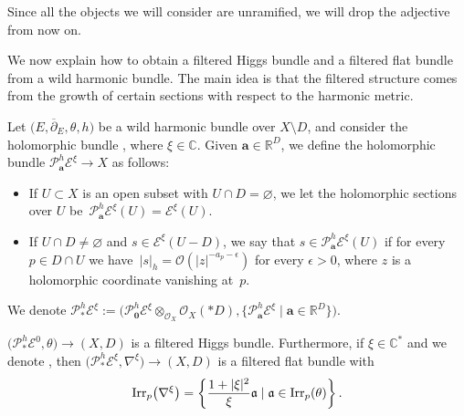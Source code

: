 \begin{Remark} Since all the objects we will consider are unramified, we will drop the adjective from now on.
\end{Remark}

We now explain how to obtain a filtered Higgs bundle and a filtered flat bundle from a wild harmonic bundle. The main idea is that the filtered structure comes from the growth of certain sections with respect to the harmonic metric.

\begin{Definition}\label{phdef} Let $\bigl(E,\overline{\partial}_E,\theta,h\bigr)$ be a wild harmonic bundle over $X\setminus D$, and consider the holomorphic bundle , where $\xi\in \mathbb{C}$. Given $\boldsymbol{a}\in \mathbb{R}^D$, we define the holomorphic bundle $\mathcal{P}_{\boldsymbol{a}}^h\mathcal{E}^{\xi}\to X$ as follows:
\begin{itemize}\itemsep=0pt
 \item If $U\subset X$ is an open subset with $U\cap D=\varnothing$, we let the holomorphic sections over $U$ be~$\mathcal{P}_{\boldsymbol{a}}^h\mathcal{E}^{\xi}(U)=\mathcal{E}^{\xi}(U)$.
 \item If $U\cap D\neq \varnothing$ and $s\in \mathcal{E}^{\xi}(U-D)$, we say that $s\in \mathcal{P}^h_{\boldsymbol{a}}\mathcal{E}^{\xi}(U)$ if for every $p\in D\cap U$ we have~${|s|_h=\mathcal{O}(|z|^{-a_p-\epsilon})}$ for every $\epsilon>0$, where $z$ is a holomorphic coordinate vanishing at~$p$.
\end{itemize}
We denote $\mathcal{P}^h_*\mathcal{E}^{\xi}:=\bigl(\mathcal{P}_{\boldsymbol{0}}^h\mathcal{E}^{\xi}\otimes_{\mathcal{O}_X}\mathcal{O}_X(*D), \bigl\{\mathcal{P}_{\boldsymbol{a}}^h\mathcal{E}^{\xi} \mid \boldsymbol{a}\in \mathbb{R}^D\bigr\}\bigr)$.
\end{Definition}
\begin{Theorem}\label{compirrpar} $\bigl(\mathcal{P}^h_*\mathcal{E}^{0},\theta\bigr)\to (X,D)$ is a filtered Higgs bundle. Furthermore, if $\xi \in \mathbb{C}^*$ and we denote , then $\bigl(\mathcal{P}^h_*\mathcal{E}^{\xi},\nabla^{\xi}\bigr)\to (X,D)$ is a filtered flat bundle with \[
\textnormal{Irr}_p\bigl(\nabla^{\xi}\bigr)=\left\{\frac{1+|\xi|^2}{\xi}\mathfrak{a} \mid \mathfrak{a}\in \textnormal{Irr}_p(\theta) \right\}.
\]
\end{Theorem}

